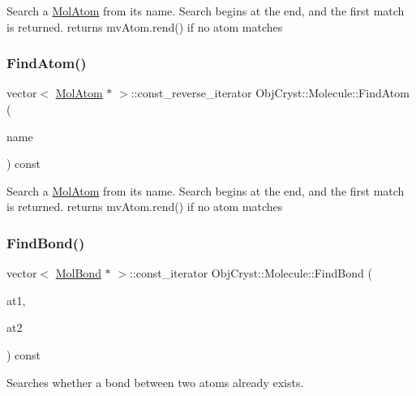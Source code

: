 Search a \mbox{\hyperlink{class_obj_cryst_1_1_mol_atom}{Mol\+Atom}} from its name. Search begins at the end, and the first match is returned. returns mv\+Atom.\+rend() if no atom matches \mbox{\label{class_obj_cryst_1_1_molecule_a671b3e6ab0bf2867632db421237807d7}} 
\subsubsection{\texorpdfstring{FindAtom()}{FindAtom()}\hspace{0.1cm}{\footnotesize\ttfamily [2/2]}}
{\footnotesize\ttfamily vector$<$ \mbox{\hyperlink{class_obj_cryst_1_1_mol_atom}{Mol\+Atom}} $\ast$ $>$\+::const\+\_\+reverse\+\_\+iterator Obj\+Cryst\+::\+Molecule\+::\+Find\+Atom (\begin{DoxyParamCaption}\item[{const string \&}]{name }\end{DoxyParamCaption}) const}

Search a \mbox{\hyperlink{class_obj_cryst_1_1_mol_atom}{Mol\+Atom}} from its name. Search begins at the end, and the first match is returned. returns mv\+Atom.\+rend() if no atom matches \mbox{\label{class_obj_cryst_1_1_molecule_a78cdfa9c0223f1f45d5aac3b0e0d4989}} 
\subsubsection{\texorpdfstring{FindBond()}{FindBond()}\hspace{0.1cm}{\footnotesize\ttfamily [1/2]}}
{\footnotesize\ttfamily vector$<$ \mbox{\hyperlink{class_obj_cryst_1_1_mol_bond}{Mol\+Bond}} $\ast$ $>$\+::const\+\_\+iterator Obj\+Cryst\+::\+Molecule\+::\+Find\+Bond (\begin{DoxyParamCaption}\item[{const \mbox{\hyperlink{class_obj_cryst_1_1_mol_atom}{Mol\+Atom}} \&}]{at1,  }\item[{const \mbox{\hyperlink{class_obj_cryst_1_1_mol_atom}{Mol\+Atom}} \&}]{at2 }\end{DoxyParamCaption}) const}

Searches whether a bond between two atoms already exists.

